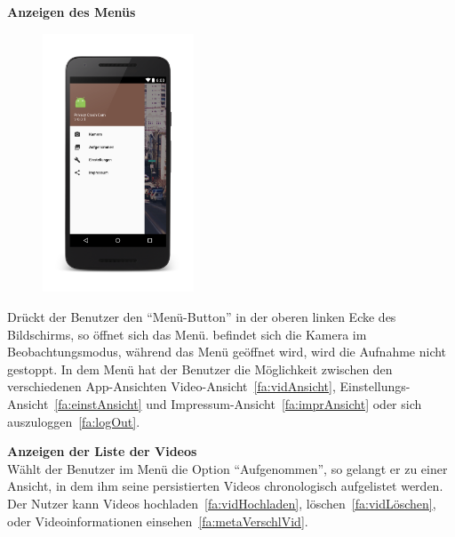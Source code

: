\begin{enumerate}
\item \begin{minipage}[t]{\linewidth} 
\textbf{Anzeigen des Menüs} \hfill \\
	\begin{figure}
		\vspace{-70pt}
  		\begin{center}
   			\includegraphics[width=0.4\textwidth]{subtopicsFuncspec/Res/Mockups/Portrait_camera_view_menu_phone.png}
  		\end{center}
  		\vspace{-20pt}
  		\vspace{-10pt}
	\end{figure}
Drückt der Benutzer den ``Menü-Button'' in der oberen linken Ecke des Bildschirms, so öffnet sich das Menü. befindet sich die Kamera im Beobachtungsmodus, während das Menü geöffnet wird, wird die Aufnahme nicht gestoppt. In dem Menü hat der Benutzer die Möglichkeit zwischen den verschiedenen \gls{App}-Ansichten Video-Ansicht~\eqref{fa:vidAnsicht}, Einstellungs-Ansicht~\eqref{fa:einstAnsicht} und Impressum-Ansicht~\eqref{fa:imprAnsicht} oder sich auszuloggen~\eqref{fa:logOut}.

\item \label{fa:vidAnsicht}\textbf{Anzeigen der Liste der  Videos} \hfill \\
Wählt der Benutzer im Menü die Option ``Aufgenommen'', so gelangt er zu einer Ansicht, in dem ihm seine persistierten Videos chronologisch aufgelistet werden. Der Nutzer kann Videos hochladen~\eqref{fa:vidHochladen}, löschen~\eqref{fa:vidLöschen}, oder Videoinformationen einsehen~\eqref{fa:metaVerschlVid}.
\end{minipage}


\end{enumerate}
